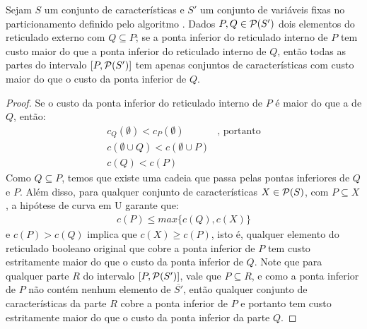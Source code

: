 \begin{mytheorem}
Sejam $S$ um conjunto de características e $S'$ um conjunto de variáveis
fixas no particionamento definido pelo algoritmo . Dados
$P, Q \in \mathcal{P} (S')$ dois elementos do reticulado externo com 
$Q \subseteq P$; se a ponta inferior do reticulado interno de $P$ tem 
custo maior do que a ponta inferior do reticulado interno de $Q$, então 
todas as partes do intervalo $[P, \mathcal{P} (S')]$ tem apenas conjuntos 
de características com custo maior do que o custo da ponta inferior de 
$Q$.
\end{mytheorem}
\begin{proof}
Se o custo da ponta inferior do reticulado interno de $P$ é maior do que
a de $Q$, então:
\begin{align*}
    c_Q (\emptyset) < c_P (\emptyset) & \text{, portanto} \\
    c (\emptyset \cup Q) < c (\emptyset \cup P) &\\
    c (Q) < c (P)
\end{align*}
Como $Q \subseteq P$, temos que existe uma cadeia que passa pelas pontas
inferiores de $Q$ e $P$. Além disso, para qualquer conjunto de 
características $X \in \mathcal{P} (S)$, com $P \subseteq X$, a hipótese 
de curva em U garante que:
\begin{align*}
    c (P) \leq max \{c (Q), c (X)\}
\end{align*}
e $c (P) > c (Q)$ implica que $c (X) \geq c (P)$, isto é, qualquer 
elemento do reticulado booleano original que cobre a ponta inferior de 
$P$ tem custo estritamente maior do que o custo da ponta inferior de $Q$.
Note que para qualquer parte $R$ do intervalo $[P, \mathcal{P} (S')]$, 
vale que $P \subseteq R$, e como a ponta inferior de $P$ não contém 
nenhum elemento de $\overline {S'}$, então qualquer conjunto de 
características da parte $R$ cobre a ponta inferior de $P$ e portanto 
tem custo estritamente maior do que o custo da ponta inferior da parte 
$Q$.
\end{proof}

